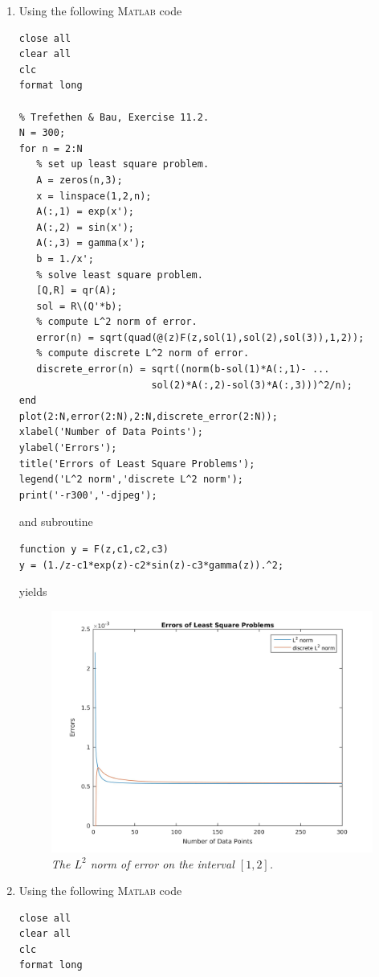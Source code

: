 \documentclass[a4paper,oneside]{book}
\numberwithin{equation}{chapter}
\begin{document}
\begin{enumerate}
\item Using the following \textsc{Matlab} code
\begin{verbatim}
close all
clear all
clc
format long

% Trefethen & Bau, Exercise 11.2.
N = 300;
for n = 2:N
   % set up least square problem.
   A = zeros(n,3);
   x = linspace(1,2,n);
   A(:,1) = exp(x');
   A(:,2) = sin(x');
   A(:,3) = gamma(x');
   b = 1./x';
   % solve least square problem.
   [Q,R] = qr(A);
   sol = R\(Q'*b);
   % compute L^2 norm of error.
   error(n) = sqrt(quad(@(z)F(z,sol(1),sol(2),sol(3)),1,2));
   % compute discrete L^2 norm of error.
   discrete_error(n) = sqrt((norm(b-sol(1)*A(:,1)- ...
                       sol(2)*A(:,2)-sol(3)*A(:,3)))^2/n);
end
plot(2:N,error(2:N),2:N,discrete_error(2:N));
xlabel('Number of Data Points');
ylabel('Errors');
title('Errors of Least Square Problems');
legend('L^2 norm','discrete L^2 norm');
print('-r300','-djpeg');
\end{verbatim}
and subroutine
\begin{verbatim}
function y = F(z,c1,c2,c3)
y = (1./z-c1*exp(z)-c2*sin(z)-c3*gamma(z)).^2;
\end{verbatim}
yields 
\begin{figure}[H]
	\centering
	\includegraphics[scale=0.14]{1}
	\caption{\textit{The $L^2$ norm of error on the interval $\left[1,2\right]$.}}
\end{figure}
\item Using the following \textsc{Matlab} code
\begin{verbatim}
close all
clear all
clc
format long


\end{verbatim}
\end{enumerate}
\end{document}
